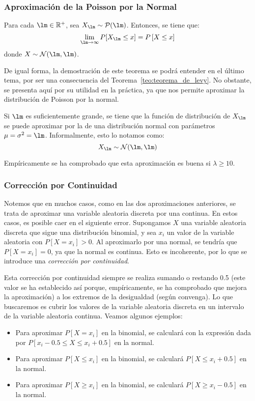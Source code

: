 \subsubsection{Aproximación de la Poisson por la Normal}
\begin{prop}
    Para cada $\lm\in \bb{R}^+$, sea $X_\lm \sim \cc{P}(\lm)$. Entonces, se tiene que:
    \begin{equation*}
        \lim_{\lm\to \infty} P[X_\lm \leq x] = P\left[X\leq x\right]
    \end{equation*}
    donde $X\sim \cc{N}(\lm,\lm)$.
\end{prop}

De igual forma, la demostración de este teorema se podrá entender en el último tema, por ser una consecuencia del Teorema~\ref{teo:teorema_de_levy}. No obstante, se presenta aquí por su utilidad en la práctica, ya que nos permite aproximar la distribución de Poisson por la normal.

Si $\lm$ es suficientemente grande, se tiene que la función de distribución de $X_\lm$ se puede aproximar por la de una distribución normal con parámetros $\mu =\sigma^2 = \lm$. Informalmente, esto lo notamos como:
\begin{equation*}
    X_\lm\sim \cc{N}(\lm,\lm)
\end{equation*}

Empíricamente se ha comprobado que esta aproximación es buena si $\lambda\geq 10$.


\subsubsection{Corrección por Continuidad}

Notemos que en muchos casos, como en las dos aproximaciones anteriores, se trata de aproximar una variable aleatoria discreta por una continua.
En estos casos, es posible caer en el siguiente error.
Supongamos $X$ una variable aleatoria discreta que sigue una distribución binomial,
y sea $x_i$ un valor de la variable aleatoria con $P[X=x_i]>0$. Al aproximarlo por una normal, se tendría que $P[X=x_i] = 0$, ya que la normal es continua.
Esto es incoherente, por lo que se introduce una \emph{corrección por continuidad}.

Esta corrección por continuidad siempre se realiza sumando o restando 0.5 (este valor se ha establecido así porque, empíricamente, se ha comprobado que mejora la aproximación) a los extremos de la desigualdad (según convenga).
Lo que buscaremos es cubrir los valores de la variable aleatoria discreta en un intervalo de la variable aleatoria continua. Veamos algunos ejemplos:
\begin{itemize}
    \item Para aproximar $P[X= x_i]$ en la binomial, se calculará con la expresión dada por $P[x_i-0.5 \leq X\leq x_i+0.5]$ en la normal.
    \item Para aproximar $P[X\leq x_i]$ en la binomial, se calculará $P[X\leq x_i+0.5]$ en la normal.
    \item Para aproximar $P[X\geq x_i]$ en la binomial, se calculará $P[X\geq x_i-0.5]$ en la normal.
\end{itemize}


